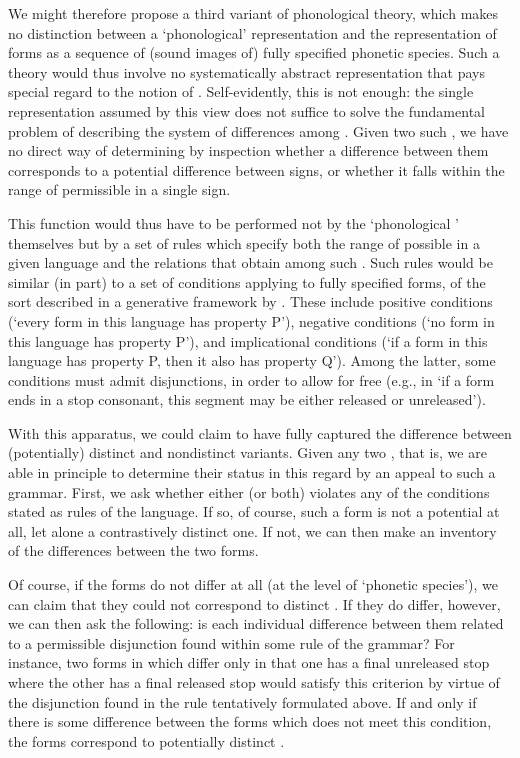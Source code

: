 We might therefore propose a third variant of phonological theory,
which makes no distinction between a `phonological' representation and
the representation of forms as a sequence of (sound images of) fully
specified phonetic species. Such a theory would thus involve no
systematically abstract representation that pays special regard to the
notion of . Self-evidently, this is not enough: the single
representation assumed by this view does not suffice to solve the
fundamental problem of describing the system of differences among
\emph{}. Given two such , we have no direct
way of determining by inspection whether a difference between them
corresponds to a potential difference between signs, or whether it
falls within the range of permissible  in a single sign.

This function would thus have to be performed not by the `phonological
' themselves but by a set of {rules} which specify both
the range of possible  in a given language and the
relations that obtain among such . Such {rules} would be
similar (in part) to a set of  conditions applying to fully
specified forms, of the sort described in a generative framework by
\citet{stanley67:redundancy}. These include positive conditions
(`every form in this language has property P'), negative conditions
(`no form in this language has property P'), and implicational
conditions (`if a form in this language has property P, then it also
has property Q'). Among the latter, some conditions must admit
disjunctions, in order to allow for free  (e.g., in 
`if a form ends in a stop consonant, this segment may be either
released or unreleased').

With this apparatus, we could claim to have fully captured the
difference between (potentially) distinct \emph{} and
nondistinct variants. Given any two , that is,
we are able in principle to determine their status in this regard by
an appeal to such a grammar. First, we ask whether either (or both)
violates any of the conditions stated as {rules} of the language. If so,
of course, such a form is not a potential \emph{} at all,
let alone a contrastively distinct one. If not, we can then make an
inventory of the differences between the two forms.

Of course, if the forms do not differ at all (at the level of
`phonetic species'), we can claim that they could not correspond to
distinct \emph{}. If they do differ, however, we can then
ask the following: is each individual difference between them related
to a permissible disjunction found within some rule of the grammar?
For instance, two forms in  which differ only in that one has a
final unreleased stop where the other has a final released stop would
satisfy this criterion by virtue of the disjunction found in the rule
tentatively formulated above. If and only if there is some difference
between the forms which does not meet this condition, the forms
correspond to potentially distinct \emph{}.

